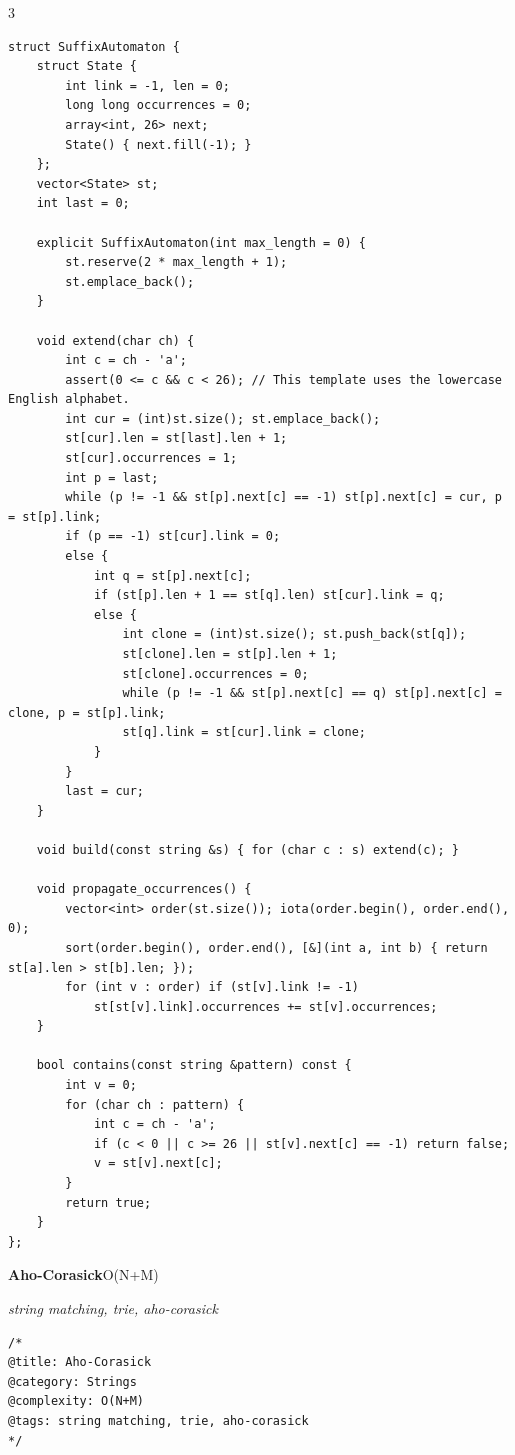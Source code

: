 \documentclass[8pt,a4paper,landscape]{article}
\begin{document}
\begin{multicols}{3}
\begin{lstlisting}
struct SuffixAutomaton {
    struct State {
        int link = -1, len = 0;
        long long occurrences = 0;
        array<int, 26> next;
        State() { next.fill(-1); }
    };
    vector<State> st;
    int last = 0;

    explicit SuffixAutomaton(int max_length = 0) {
        st.reserve(2 * max_length + 1);
        st.emplace_back();
    }

    void extend(char ch) {
        int c = ch - 'a';
        assert(0 <= c && c < 26); // This template uses the lowercase English alphabet.
        int cur = (int)st.size(); st.emplace_back();
        st[cur].len = st[last].len + 1;
        st[cur].occurrences = 1;
        int p = last;
        while (p != -1 && st[p].next[c] == -1) st[p].next[c] = cur, p = st[p].link;
        if (p == -1) st[cur].link = 0;
        else {
            int q = st[p].next[c];
            if (st[p].len + 1 == st[q].len) st[cur].link = q;
            else {
                int clone = (int)st.size(); st.push_back(st[q]);
                st[clone].len = st[p].len + 1;
                st[clone].occurrences = 0;
                while (p != -1 && st[p].next[c] == q) st[p].next[c] = clone, p = st[p].link;
                st[q].link = st[cur].link = clone;
            }
        }
        last = cur;
    }

    void build(const string &s) { for (char c : s) extend(c); }

    void propagate_occurrences() {
        vector<int> order(st.size()); iota(order.begin(), order.end(), 0);
        sort(order.begin(), order.end(), [&](int a, int b) { return st[a].len > st[b].len; });
        for (int v : order) if (st[v].link != -1)
            st[st[v].link].occurrences += st[v].occurrences;
    }

    bool contains(const string &pattern) const {
        int v = 0;
        for (char ch : pattern) {
            int c = ch - 'a';
            if (c < 0 || c >= 26 || st[v].next[c] == -1) return false;
            v = st[v].next[c];
        }
        return true;
    }
};
\end{lstlisting}
\vspace{1pt}
\textbf{Aho-Corasick}\hfill{\scriptsize O(N+M)}\par
{\scriptsize\itshape string matching, trie, aho-corasick}\par
\begin{lstlisting}
/*
@title: Aho-Corasick
@category: Strings
@complexity: O(N+M)
@tags: string matching, trie, aho-corasick
*/


\end{lstlisting}
\end{multicols}
\end{document}
